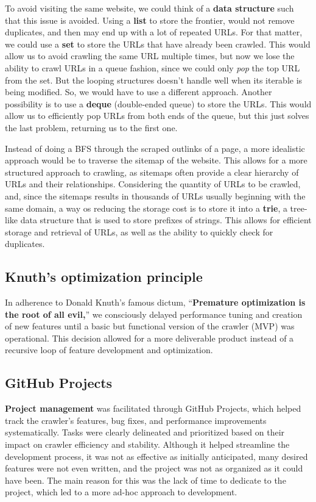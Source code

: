To avoid visiting the same website, we could think of a \textbf{data structure} such that this issue is avoided. Using a \textbf{list} to store the frontier, would not remove duplicates, and then may end up with a lot of repeated URLs. For that matter, we could use a \textbf{set} to store the URLs that have already been crawled. This would allow us to avoid crawling the same URL multiple times, but now we lose the ability to crawl URLs in a queue fashion, since we could only \textit{pop} the top URL from the set. But the looping structures doesn't handle well when its iterable is being modified. So, we would have to use a different approach. Another possibility is to use a \textbf{deque} (double-ended queue) to store the URLs. This would allow us to efficiently pop URLs from both ends of the queue, but this just solves the last problem, returning us to the first one.

Instead of doing a BFS through the scraped outlinks of a page, a more idealistic approach would be to traverse the sitemap of the website. This allows for a more structured approach to crawling, as sitemaps often provide a clear hierarchy of URLs and their relationships. Considering the quantity of URLs to be crawled, and, since the sitemaps results in thousands of URLs usually beginning with the same domain, a way os reducing the storage cost is to store it into a \textbf{trie}, a tree-like data structure that is used to store prefixes of strings. This allows for efficient storage and retrieval of URLs, as well as the ability to quickly check for duplicates.

\subsection{Knuth's optimization principle}

In adherence to Donald Knuth's famous dictum, ``\textbf{Premature optimization is the root of all evil,}'' we consciously delayed performance tuning and creation of new features until a basic but functional version of the crawler (MVP) was operational. This decision allowed for a more deliverable product instead of a recursive loop of feature development and optimization.

\subsection{GitHub Projects}

\textbf{Project management} was facilitated through GitHub Projects, which helped track the crawler's features, bug fixes, and performance improvements systematically. Tasks were clearly delineated and prioritized based on their impact on crawler efficiency and stability. Although it helped streamline the development process, it was not as effective as initially anticipated, many desired features were not even written, and the project was not as organized as it could have been. The main reason for this was the lack of time to dedicate to the project, which led to a more ad-hoc approach to development.

